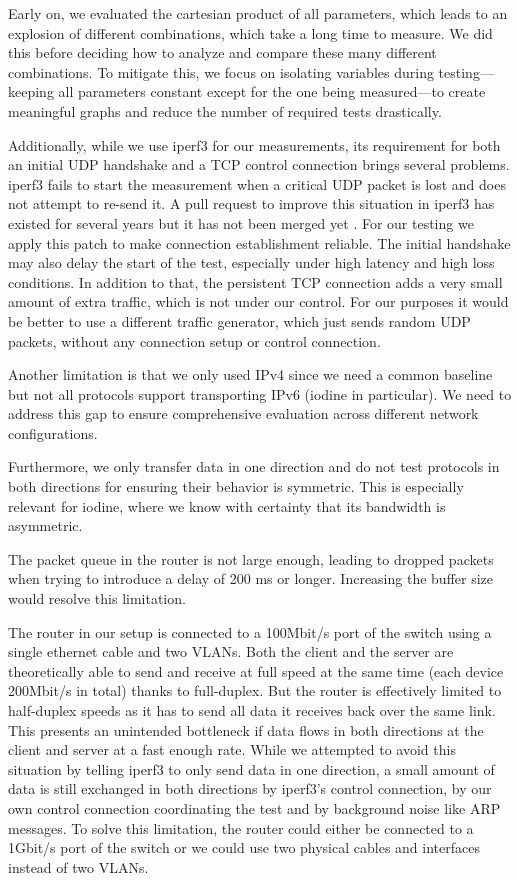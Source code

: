 Early on, we evaluated the cartesian product of all parameters, which leads to an explosion of different combinations, which take a long time to measure.
We did this before deciding how to analyze and compare these many different combinations.
To mitigate this, we focus on isolating variables during testing—keeping all parameters constant except for the one being measured—to create meaningful graphs and reduce the number of required tests drastically.

Additionally, while we use iperf3 for our measurements, its requirement for both an initial UDP handshake and a TCP control connection brings several problems.
iperf3 fails to start the measurement when a critical UDP packet is lost and does not attempt to re-send it.
A pull request to improve this situation in iperf3 has existed for several years but it has not been merged yet \cite{iperf-udp-connect-retry}.
For our testing we apply this patch to make connection establishment reliable.
The initial handshake may also delay the start of the test, especially under high latency and high loss conditions.
In addition to that, the persistent TCP connection adds a very small amount of extra traffic, which is not under our control.
For our purposes it would be better to use a different traffic generator, which just sends random UDP packets, without any connection setup or control connection.

Another limitation is that we only used IPv4 since we need a common baseline but not all protocols support transporting IPv6 (iodine in particular).
We need to address this gap to ensure comprehensive evaluation across different network configurations.

Furthermore, we only transfer data in one direction and do not test protocols in both directions for ensuring their behavior is symmetric.
This is especially relevant for iodine, where we know with certainty that its bandwidth is asymmetric.

The packet queue in the router is not large enough, leading to dropped packets when trying to introduce a delay of 200 ms or longer.
Increasing the buffer size would resolve this limitation.

The router in our setup is connected to a 100Mbit/s port of the switch using a single ethernet cable and two VLANs.
Both the client and the server are theoretically able to send and receive at full speed at the same time (each device 200Mbit/s in total) thanks to full-duplex.
But the router is effectively limited to half-duplex speeds as it has to send all data it receives back over the same link.
This presents an unintended bottleneck if data flows in both directions at the client and server at a fast enough rate.
While we attempted to avoid this situation by telling iperf3 to only send data in one direction, a small amount of data is still exchanged in both directions by iperf3's control connection, by our own control connection coordinating the test and by background noise like ARP messages.
To solve this limitation, the router could either be connected to a 1Gbit/s port of the switch or we could use two physical cables and interfaces instead of two VLANs.


